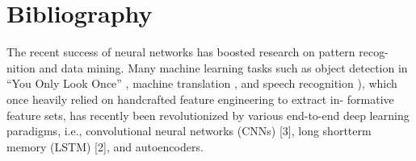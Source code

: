 \documentclass[letter, 12pt]{article}
\begin{document}
\section{Bibliography}
The recent success of neural networks has boosted research on pattern recog-
nition and data mining. Many machine learning tasks such as object detection
in “You Only Look Once” \cite{lecun1995convolutional}, machine translation \cite{hochreiter1997long}, and speech recognition
\cite{redmon2016you}), which once heavily relied on handcrafted feature engineering to extract in-
formative feature sets, has recently been revolutionized by various end-to-end
deep learning paradigms, i.e., convolutional neural networks (CNNs) [3], long
shortterm memory (LSTM) [2], and autoencoders.



\end{document}
